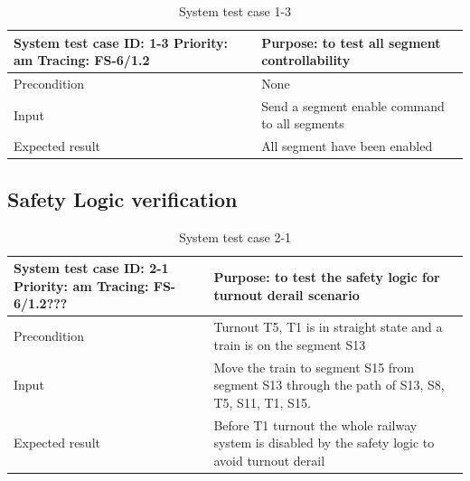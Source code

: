 \begin{table}[H]
	\caption{System test case 1-3}
	\label{table:TCase-FSS1-3}
	\begin{center}
		\renewcommand{\arraystretch}{1.8}
		\begin{tabu} 
			to 0.9 \textwidth
			{  X[0.4, c] X[c] }
			\toprule
			System test case ID: 1-3 \newline Priority: am \newline Tracing: FS-6/1.2 & Purpose: to test all segment controllability  \\ \midrule
			Precondition                                                              & None                                          \\
			Input                                                                     & Send a segment enable command to all segments \\
			Expected result                                                           & All segment have been enabled                 \\ \bottomrule
		\end{tabu}
	\end{center}
\end{table}

\subsection{Safety Logic verification}
\begin{table}[H]
	\caption{System test case 2-1}
	\label{table:TCase-FSS2-1}
	\begin{center}
		\renewcommand{\arraystretch}{1.8}
		\begin{tabu} 
			to 0.9 \textwidth
			{  X[0.4, c] X[c] }
			\toprule
			System test case ID: 2-1 \newline Priority: am \newline Tracing: FS-6/1.2??? & Purpose: to test the safety logic for turnout derail scenario                                      \\ \midrule
			Precondition                                                                 & Turnout T5, T1 is in straight state and a train is on the segment S13                              \\
			Input                                                                        & Move the train to segment S15 from segment S13 through the path of S13, S8, T5, S11, T1, S15.      \\
			Expected result                                                              & Before T1 turnout the whole railway system is disabled by the safety logic to avoid turnout derail \\ \bottomrule
		\end{tabu}
	\end{center}
\end{table}

